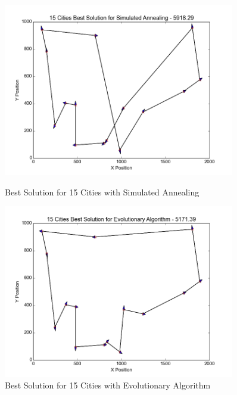 \begin{figure}[H]
	\centering
    \begin{minipage}{0.45\textwidth}
        \centering
        \includegraphics[width=0.9\textwidth]{15City_SA.png} %
        \caption{Best Solution for 15 Cities with Simulated Annealing}
        \label{fig:15city_SA}
    \end{minipage}\hfill
    \begin{minipage}{0.45\textwidth}
        \centering
        \includegraphics[width=0.9\textwidth]{15City_EA.png} %
        \caption{Best Solution for 15 Cities with Evolutionary Algorithm}
        \label{fig:15city_EA}
    \end{minipage}\hfill
    \begin{minipage}{0.45\textwidth}
        \centering

\end{minipage}
\end{figure}
